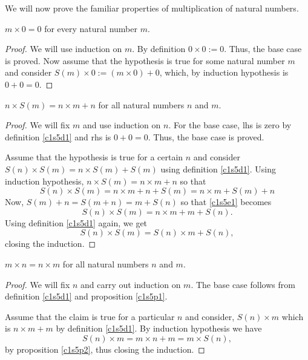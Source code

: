 We will now prove the familiar properties of multiplication of natural
numbers.
\begin{prop}\label{c1s5p1}
$m \times 0 = 0$ for every natural number $m$.
\end{prop}
\begin{proof}
We will use induction on $m$. By definition $0 \times 0 := 0$. Thus, the
base case is proved. Now assume that the hypothesis is true for some 
natural number $m$ and consider $S(m) \times 0 := (m \times 0) + 0$, which,
by induction hypothesis is $0 + 0 = 0$.
\end{proof}

\begin{prop}\label{c1s5p2}
$n \times S(m) = n \times m + n$ for all natural numbers $n$ and $m$.
\end{prop}
\begin{proof}
We will fix $m$ and use induction on $n$. For the base case, lhs is zero by
definition \ref{c1s5d1} and rhs is $0 + 0 = 0$. Thus, the base case is proved.

Assume that the hypothesis is true for a certain $n$ and consider $S(n) \times
S(m) = n \times S(m) + S(m)$ using definition \ref{c1s5d1}. Using induction
hypothesis, $n \times S(m) = n \times m + n$ so that
\begin{equation}\label{c1s5e1}
S(n) \times S(m) = n \times m + n + S(m) = n \times m + S(m) + n
\end{equation}
Now, $S(m) + n = S(m + n) = m + S(n)$ so that \eqref{c1s5e1} becomes
\begin{equation}\label{c1s5e2}
S(n) \times S(m) = n \times m + m + S(n).
\end{equation}
Using definition \eqref{c1s5d1} again, we get
\begin{equation}\label{c1s5e3}
S(n) \times S(m) = S(n) \times m + S(n),
\end{equation}
closing the induction.
\end{proof}

\begin{prop}
$m \times n = n \times m$ for all natural numbers $n$ and $m$.
\end{prop}
\begin{proof}
We will fix $n$ and carry out induction on $m$. The base case follows from 
definition \ref{c1s5d1} and proposition \ref{c1s5p1}.

Assume that the claim is true for a particular $n$ and consider, $S(n) \times
m$ which is $n \times m + m$ by definition \ref{c1s5d1}. By induction 
hypothesis we have
\begin{equation}\label{c1s5e4}
S(n) \times m = m \times n + m = m \times S(n),
\end{equation}
by proposition \ref{c1s5p2}, thus closing the induction.
\end{proof}